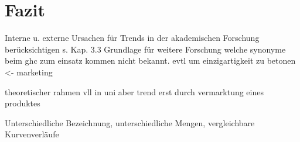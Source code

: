 \section{Fazit}
Interne u. externe Ursachen für Trends in der akademischen Forschung berücksichtigen s. Kap. 3.3
Grundlage für weitere Forschung
welche synonyme beim ghc zum einsatz kommen nicht bekannt. evtl um einzigartigkeit zu betonen <- marketing

theoretischer rahmen vll in uni aber trend erst durch vermarktung eines produktes

Unterschiedliche Bezeichnung, unterschiedliche Mengen, vergleichbare Kurvenverläufe